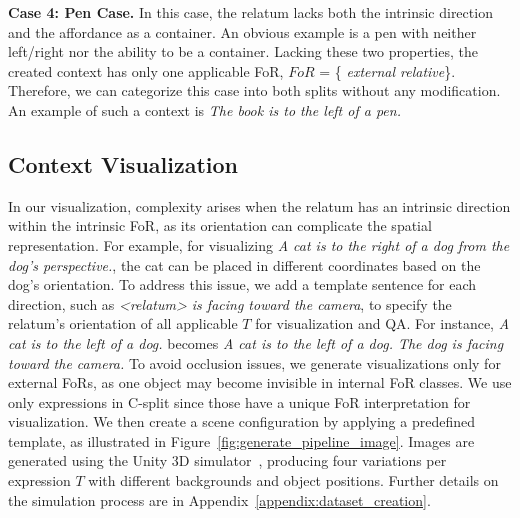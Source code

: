 \noindent\textbf{Case 4: Pen Case.} 
In this case, the relatum lacks both the intrinsic direction and the affordance as a container. 
An obvious example is a pen with neither left/right nor the ability to be a container.
Lacking these two properties, the created context has only one applicable FoR, $FoR$ = \{ \textit{external relative}\}.
Therefore, we can categorize this case into both splits without any modification.
An example of such a context is \textit{The book is to the left of a pen.}


\subsection{Context Visualization}\label{sec:context_visualize}
In our visualization, complexity arises when the relatum has an intrinsic direction within the intrinsic FoR, as its orientation can complicate the spatial representation.
For example, for visualizing \textit{A cat is to the right of a dog from the dog's perspective.}, the cat can be placed in different coordinates based on the dog’s orientation.
To address this issue, we add a template sentence for each direction, such as \textit{<relatum> is facing toward the camera}, to specify the relatum's orientation of all applicable $T$ for visualization and QA.
For instance, \textit{A cat is to the left of a dog.} becomes \textit{A cat is to the left of a dog. The dog is facing toward the camera.}
To avoid occlusion issues, we generate visualizations only for external FoRs, as one object may become invisible in internal FoR classes.
We use only expressions in C-split since those have a unique FoR interpretation for visualization. 
We then create a scene configuration by applying a predefined template, as illustrated in Figure~\ref{fig:generate_pipeline_image}.
Images are generated using the Unity 3D simulator~\cite{juliani2020unitygeneralplatformintelligent}, producing four variations per expression $T$ with different backgrounds and object positions. Further details on the simulation process are in Appendix~\ref{appendix:dataset_creation}.


% 
